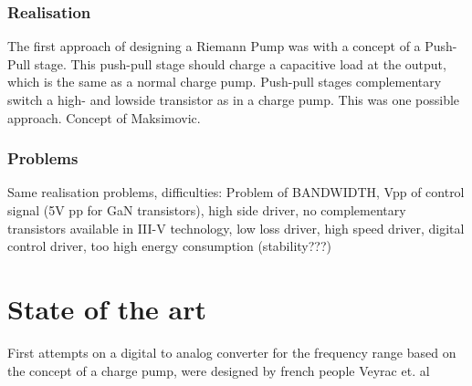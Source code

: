 \subsection{Realisation}
The first approach of designing a Riemann Pump was with a concept of a Push-Pull stage. This push-pull stage should charge a capacitive load at the output, which is the same as a normal charge pump. Push-pull stages complementary switch a high- and lowside transistor as in a charge pump. This was one possible approach. Concept of Maksimovic. 
\subsection{Problems}
Same realisation problems, difficulties: Problem of BANDWIDTH, Vpp of control signal (5V pp for GaN transistors), high side driver, no complementary transistors available in III-V technology, low loss driver, high speed driver, digital control driver, too high energy consumption (stability???)
\chapter{State of the art}
First attempts on a digital to analog converter for the frequency range based on the concept of a charge pump, were designed by french people Veyrac et. al